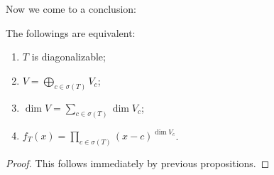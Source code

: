 Now we come to a conclusion:

\begin{theorem}
    The followings are equivalent:
	\begin{enumerate}
		\item $T$ is diagonalizable;
		\item  $V=\bigoplus\limits_{c\in\sigma(T)}V_c$;
		\item  $\dim V = \sum\limits_{c\in\sigma(T)}\dim V_c$;
		\item $f_T(x)=\prod\limits_{c\in\sigma(T)}(x-c)^{\dim V_c}$.
	\end{enumerate}
\end{theorem}
\begin{proof}[Proof]
    This follows immediately by previous propositions.
\end{proof}
